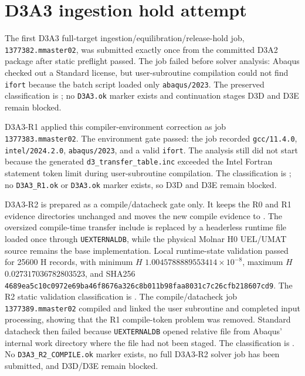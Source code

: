 \section{D3A3 ingestion hold attempt}
The first D3A3 full-target ingestion/equilibration/release-hold job,
\texttt{1377382.mmaster02}, was submitted exactly once from the committed D3A2
package after static preflight passed. The job failed before solver analysis:
Abaqus checked out a Standard license, but user-subroutine compilation could
not find \texttt{ifort} because the batch script loaded only
\texttt{abaqus/2023}. The preserved classification is
; no \texttt{D3A3.ok} marker
exists and continuation stages D3D and D3E remain blocked.

D3A3-R1 applied this compiler-environment correction as job
\texttt{1377383.mmaster02}. The environment gate passed: the job recorded
\texttt{gcc/11.4.0}, \texttt{intel/2024.2.0}, \texttt{abaqus/2023}, and a
valid \texttt{ifort}. The analysis still did not start because the generated
\texttt{d3\_transfer\_table.inc} exceeded the Intel Fortran statement token
limit during user-subroutine compilation. The classification is
; no \texttt{D3A3\_R1.ok}
or \texttt{D3A3.ok} marker exists, so D3D and D3E remain blocked.

D3A3-R2 is prepared as a compile/datacheck gate only. It keeps the R0 and R1
evidence directories unchanged and moves the new compile evidence to
.
The oversized compile-time transfer include is replaced by a headerless runtime
 file loaded once through \texttt{UEXTERNALDB}, while
the physical Molnar H0 UEL/UMAT source remains the base implementation. Local
runtime-state validation passed for 25600 H records, with minimum $H$
$1.0045788889553414\times10^{-8}$, maximum $H$
$0.027317036782803523$, and SHA256
\texttt{4689ea5c10c0972e69ba46f8676a326c8b011b98faa8031c7c26cfb218607cd9}.
The R2 static validation classification is
. The compile/datacheck job
\texttt{1377389.mmaster02} compiled and linked the user subroutine and
completed input processing, showing that the R1 compile-token problem was
removed. Standard datacheck then failed because \texttt{UEXTERNALDB} opened
relative file  from Abaqus' internal 
work directory where the file had not been staged. The classification is
. No
\texttt{D3A3\_R2\_COMPILE.ok} marker exists, no full D3A3-R2 solver job has
been submitted, and D3D/D3E remain blocked.

